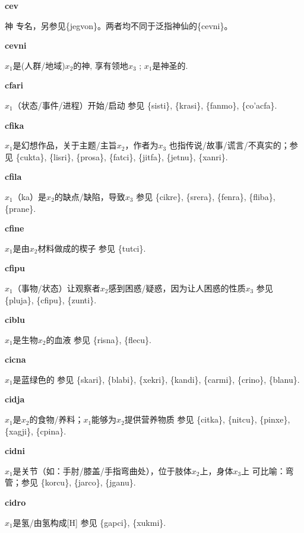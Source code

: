 \documentclass[notitlepage,twocolumn,a4paper,10pt]{book}
\begin{document}
{\sffamily\bfseries cev} 神 \textemdash{} 专名，另参见\{jegvon\}。两者均不同于泛指神仙的\{cevni\}。

{\sffamily\bfseries cevni}  $x_1$是(人群\slash{}地域)$x_2$的神, 享有领地$x_3$ ; $x_1$是神圣的.

{\sffamily\bfseries cfari}\enspace {\ttfamily\bfseries[    cfa]}  $x_1$（状态\slash{}事件\slash{}进程）开始\slash{}启动 \textemdash{} 参见 \{sisti\}, \{krasi\}, \{fanmo\}, \{co'acfa\}.

{\sffamily\bfseries cfika}\enspace {\ttfamily\bfseries[fik     fi'a]}  $x_1$是幻想作品，关于主题\slash{}主旨$x_2$，作者为$x_3$ \textemdash{} 也指传说\slash{}故事\slash{}谎言\slash{}不真实的；参见 \{cukta\}, \{lisri\}, \{prosa\}, \{fatci\}, \{jitfa\}, \{jetnu\}, \{xanri\}.

{\sffamily\bfseries cfila}\enspace {\ttfamily\bfseries[    cfi]}  $x_1$（ka）是$x_2$的缺点\slash{}缺陷，导致$x_3$ \textemdash{} 参见 \{cikre\}, \{srera\}, \{fenra\}, \{fliba\}, \{prane\}.

{\sffamily\bfseries cfine} $x_1$是由$x_2$材料做成的楔子 \textemdash{} 参见 \{tutci\}.

{\sffamily\bfseries cfipu}\enspace {\ttfamily\bfseries[        fi'u]}  $x_1$（事物\slash{}状态）让观察者$x_2$感到困惑\slash{}疑惑，因为让人困惑的性质$x_3$ \textemdash{} 参见 \{pluja\}, \{cfipu\}, \{zunti\}.

{\sffamily\bfseries ciblu}\enspace {\ttfamily\bfseries[    blu]}  $x_1$是生物$x_2$的血液 \textemdash{} 参见 \{risna\}, \{flecu\}.

{\sffamily\bfseries cicna} $x_1$是蓝绿色的 \textemdash{} 参见 \{skari\}, \{blabi\}, \{xekri\}, \{kandi\}, \{carmi\}, \{crino\}, \{blanu\}.

{\sffamily\bfseries cidja}\enspace {\ttfamily\bfseries[    dja]}  $x_1$是$x_2$的食物\slash{}养料；$x_1$能够为$x_2$提供营养物质 \textemdash{} 参见 \{citka\}, \{nitcu\}, \{pinxe\}, \{xagji\}, \{cpina\}.

{\sffamily\bfseries cidni}\enspace {\ttfamily\bfseries[cid]}  $x_1$是关节（如：手肘\slash{}膝盖\slash{}手指弯曲处），位于肢体$x_2$上，身体$x_3$上 \textemdash{} 可比喻：弯管；参见 \{korcu\}, \{jarco\}, \{jganu\}.

{\sffamily\bfseries cidro}\enspace {\ttfamily\bfseries[    dro]}  $x_1$是氢\slash{}由氢构成[H] \textemdash{} 参见 \{gapci\}, \{xukmi\}.
\end{document}
